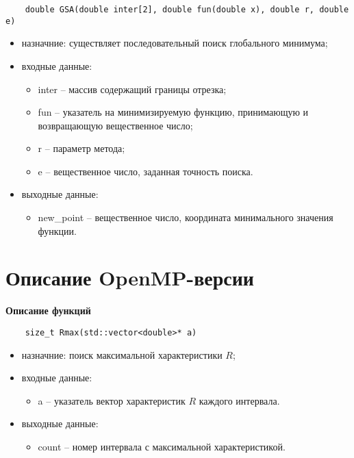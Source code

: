 \documentclass{report}
\begin{document}
\begin{lstlisting}
    double GSA(double inter[2], double fun(double x), double r, double e)
\end{lstlisting}
\begin{itemize}
    \item назначние: существляет последовательный поиск глобального минимума;
    \item входные данные:
        \begin{itemize}	
            \item inter – массив содержащий границы отрезка;
            \item fun – указатель на минимизируемую функцию, принимающую и возвращающую вещественное число;
            \item r – параметр метода;
            \item e – вещественное число, заданная точность поиска.
        \end{itemize}
    \item выходные данные:
        \begin{itemize}
            \item new\_point – вещественное число, координата минимального значения функции.
        \end{itemize}
\end{itemize}

\section{Описание OpenMP-версии}

\textbf{Описание функций}

\begin{lstlisting}
    size_t Rmax(std::vector<double>* a) 
\end{lstlisting}
\begin{itemize}
    \item назначние: поиск максимальной характеристики $R$;
    \item входные данные:
        \begin{itemize}	
            \item a – указатель вектор характеристик $R$ каждого интервала.
        \end{itemize}
    \item выходные данные:
        \begin{itemize}
        	\item count – номер интервала с максимальной характеристикой.
        \end{itemize}
\end{itemize}
\end{document}
